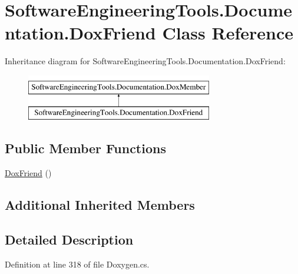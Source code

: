 \hypertarget{class_software_engineering_tools_1_1_documentation_1_1_dox_friend}{\section{Software\+Engineering\+Tools.\+Documentation.\+Dox\+Friend Class Reference}
\label{class_software_engineering_tools_1_1_documentation_1_1_dox_friend}
}
Inheritance diagram for Software\+Engineering\+Tools.\+Documentation.\+Dox\+Friend\+:\begin{figure}[H]
\begin{center}
\leavevmode
\includegraphics[height=2.000000cm]{class_software_engineering_tools_1_1_documentation_1_1_dox_friend}
\end{center}
\end{figure}
\subsection*{Public Member Functions}
\begin{DoxyCompactItemize}
\item 
\hyperlink{class_software_engineering_tools_1_1_documentation_1_1_dox_friend_ae5e93accc706be0be00fd8404fbc2fed}{Dox\+Friend} ()
\end{DoxyCompactItemize}
\subsection*{Additional Inherited Members}


\subsection{Detailed Description}


Definition at line 318 of file Doxygen.\+cs.



